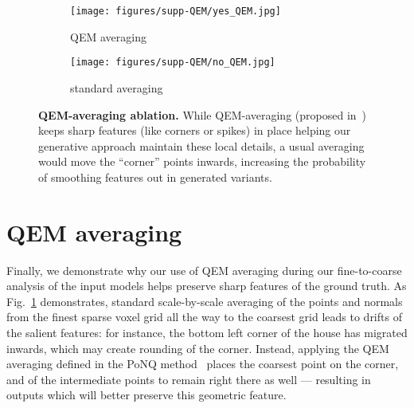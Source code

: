 \begin{figure}[h] \vspace*{-3mm}
\centering
    \begin{subfigure}{.49\linewidth}
        \centering
        \texttt{[image: figures/supp-QEM/yes\_QEM.jpg]}
        \caption{QEM averaging}
    \end{subfigure}
    \begin{subfigure}{.49\linewidth}
        \centering
        \texttt{[image: figures/supp-QEM/no\_QEM.jpg]}
         \caption{standard averaging}
    \end{subfigure}
    \caption{\textbf{QEM-averaging ablation.} While QEM-averaging (proposed in~\cite{maruani_ponq_2024}) keeps sharp features (like corners or spikes) in place helping our generative approach maintain these local details, a usual averaging would move the ``corner'' points inwards, increasing the probability of smoothing features out in generated variants.\vspace*{-1mm}}
    \label{fig:qem-ablation2}
\end{figure}


\section{QEM averaging}
\label{sec:qem}

Finally, we demonstrate why our use of QEM averaging during our fine-to-coarse analysis of the input models helps preserve sharp features of the ground truth. As Fig.~\ref{fig:qem-ablation2} demonstrates, standard scale-by-scale averaging of the points and normals from the finest sparse voxel grid all the way to the coarsest grid leads to drifts of the salient features: for instance, the bottom left corner of the house has migrated inwards, which may create rounding of the corner. Instead, applying the QEM averaging defined in the PoNQ method~\cite{maruani_ponq_2024} places the coarsest point on the corner, and of the intermediate points to remain right there as well --- resulting in outputs which will better preserve this geometric feature.


